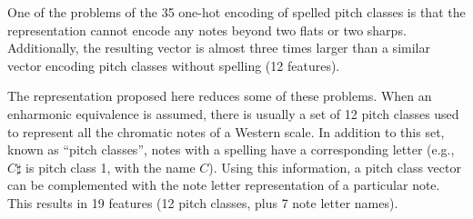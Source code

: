 
One of the problems of the 35 one-hot encoding of spelled
pitch classes is that the representation cannot encode any
notes beyond two flats or two sharps. Additionally, the
resulting vector is almost three times larger than a similar
vector encoding pitch classes without spelling (12
features).

The representation proposed here reduces some of these
problems. When an enharmonic equivalence is assumed, there
is usually a set of 12 pitch classes used to represent all
the chromatic notes of a Western scale. In addition to this
set, known as ``pitch classes'', notes with a spelling have
a corresponding letter (e.g., $C\sharp$ is pitch class 1,
with the name $C$). Using this information, a pitch class
vector can be complemented with the note letter
representation of a particular note. This results in 19
features (12 pitch classes, plus 7 note letter names).
